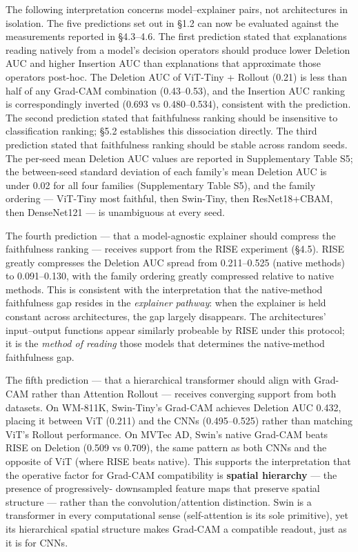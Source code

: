\documentclass[11pt,a4paper]{article}
\begin{document}
The following interpretation concerns model--explainer pairs, not architectures in isolation. The five predictions set out in \S{}1.2 can now be evaluated against the measurements reported in \S{}4.3--4.6. The first prediction stated that explanations reading natively from a model's decision operators should produce lower Deletion AUC and higher Insertion AUC than explanations that approximate those operators post-hoc. The Deletion AUC of ViT-Tiny + Rollout (0.21) is less than half of any Grad-CAM combination (0.43--0.53), and the Insertion AUC ranking is correspondingly inverted (0.693 vs 0.480--0.534), consistent with the prediction. The second prediction stated that faithfulness ranking should be insensitive to classification ranking; \S{}5.2 establishes this dissociation directly. The third prediction stated that faithfulness ranking should be stable across random seeds. The per-seed
mean Deletion AUC values are reported in Supplementary Table S5; the between-seed standard deviation of each family's mean Deletion AUC is under 0.02 for all four families (Supplementary Table S5), and the family ordering --- ViT-Tiny most faithful, then Swin-Tiny, then ResNet18+CBAM, then DenseNet121 --- is unambiguous at every seed.

The fourth prediction --- that a model-agnostic explainer should compress the faithfulness ranking --- receives support from the RISE experiment (\S{}4.5). RISE greatly compresses the Deletion AUC spread from 0.211--0.525 (native methods) to 0.091--0.130, with the family ordering greatly compressed relative to native methods. This is consistent with the interpretation that the native-method faithfulness gap resides in the \emph{explainer pathway}: when the explainer is held constant across architectures, the gap largely disappears. The architectures' input--output functions appear similarly probeable by RISE under this protocol; it is the \emph{method of reading} those models that determines the native-method faithfulness gap.

The fifth prediction --- that a hierarchical transformer should align with Grad-CAM rather than Attention Rollout --- receives converging support from both datasets. On WM-811K, Swin-Tiny's Grad-CAM achieves Deletion AUC 0.432, placing it between ViT (0.211) and the CNNs (0.495--0.525) rather than matching ViT's Rollout performance. On MVTec AD, Swin's native Grad-CAM beats RISE on Deletion (0.509 vs 0.709), the same pattern as both CNNs and the opposite of ViT (where RISE beats native). This supports the interpretation that the operative factor for Grad-CAM compatibility is \textbf{spatial hierarchy} --- the presence of progressively- downsampled feature maps that preserve spatial structure --- rather than the convolution/attention distinction. Swin is a transformer in every computational sense (self-attention is its sole primitive), yet its hierarchical spatial structure makes Grad-CAM
a compatible readout, just as it is for CNNs.
\end{document}
